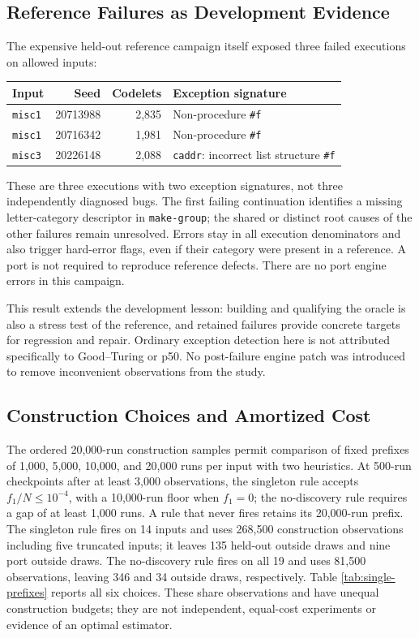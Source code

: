 \documentclass[10pt,letterpaper]{article}
\begin{document}
\subsection{Reference Failures as Development Evidence}\label{sec:reference-failures}

The expensive held-out reference campaign itself exposed three failed executions on
allowed inputs:

{\def\LTcaptype{none} %
\begin{longtable}[]{@{}lrrl@{}}
\toprule\noalign{}
Input & Seed & Codelets & Exception signature \\
\midrule\noalign{}
\endhead
\bottomrule\noalign{}
\endlastfoot
\texttt{misc1} & 20713988 & 2,835 & Non-procedure \texttt{\#f} \\
\texttt{misc1} & 20716342 & 1,981 & Non-procedure \texttt{\#f} \\
\texttt{misc3} & 20226148 & 2,088 & \texttt{caddr}: incorrect list structure
\texttt{\#f} \\
\end{longtable}
}

These are three executions with two exception signatures, not three independently
diagnosed bugs. The first failing continuation identifies a missing letter-category
descriptor in \texttt{make-group}; the shared or distinct root causes of the other
failures remain unresolved. Errors stay in all execution denominators and also trigger
hard-error flags, even if their category were present in a reference. A port is not
required to reproduce reference defects. There are no port engine errors in this campaign.

This result extends the development lesson: building and qualifying the oracle is also a
stress test of the reference, and retained failures provide concrete targets for
regression and repair. Ordinary exception detection here is not attributed specifically to
Good--Turing or p50. No post-failure engine patch was introduced to remove inconvenient
observations from the study.

\subsection{Construction Choices and Amortized Cost}\label{sec:single-cost}

The ordered 20,000-run construction samples permit comparison of fixed prefixes of 1,000,
5,000, 10,000, and 20,000 runs per input with two heuristics. At 500-run checkpoints after
at least 3,000 observations, the singleton rule accepts \(f_1/N\le10^{-4}\), with a
10,000-run floor when \(f_1=0\); the no-discovery rule requires a gap of at least 1,000
runs. A rule that never fires retains its 20,000-run prefix. The singleton rule fires on
14 inputs and uses 268,500 construction observations including five truncated inputs; it
leaves 135 held-out outside draws and nine port outside draws. The no-discovery rule fires
on all 19 and uses 81,500 observations, leaving 346 and 34 outside draws, respectively.
Table \ref{tab:single-prefixes} reports all six choices. These share observations and have
unequal construction budgets; they are not independent, equal-cost experiments or evidence
of an optimal estimator.
\end{document}
